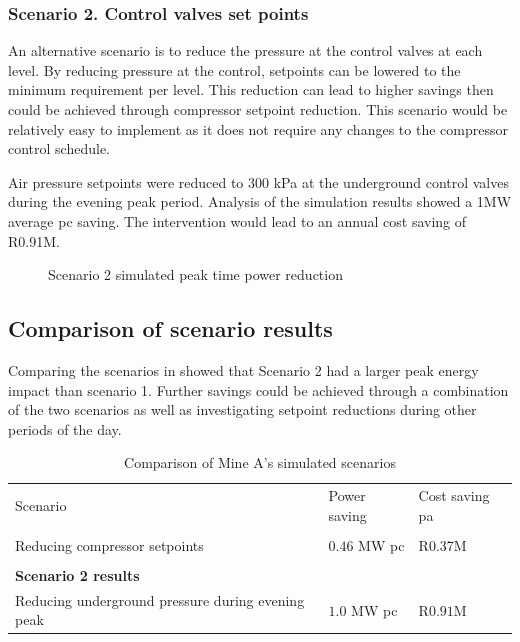 \subsubsection{Scenario 2. Control valves set points}
An alternative scenario is to reduce the pressure at the control valves at each level. By reducing pressure at the control, setpoints can be lowered to the minimum requirement per level. This reduction can lead to higher savings then could be achieved through compressor setpoint reduction. This scenario would be relatively easy to implement as it does not require any changes to the compressor control schedule.
\par 
Air pressure setpoints were reduced to 300 kPa at the underground control valves during the evening peak period. Analysis of the simulation results showed a 1MW average \gls{pc} saving. The intervention would lead to an annual cost saving of R0.91M.
\begin{figure}[h!]
	\centering
	
	\caption{Scenario 2 simulated peak time power reduction}
	\label{fig: Control Valve Results Beatrix}
\end{figure}
\subsection{Comparison of scenario results}
Comparing the scenarios in  showed that Scenario 2 had a larger peak energy impact than scenario 1. Further savings could be achieved through a combination of the two scenarios as well as investigating setpoint reductions during other periods of the day.
\begin{table}[h!]
	\centering
	\begin{tabular}{p{}
			p{}
			p{}}
		\hline 
		Scenario & Power saving & Cost saving \gls{pa} \\
		\hhline{===} 
		\multicolumn{3}{l}{\textbf{Scenario 1 results}} \\
		Reducing compressor setpoints & $ 0.46 $ MW \gls{pc} & R0.37M \\
		\\
		\multicolumn{3}{l}{\textbf{Scenario 2 results}} \\
		Reducing underground pressure during evening peak& $ 1.0 $ MW \gls{pc} & R$ 0.91 $M\\
		\hline
	\end{tabular}
	\caption{Comparison of Mine A's simulated scenarios}
	\label{Table: A Comparison}
\end{table}

